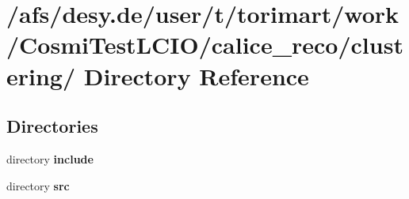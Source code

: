 \section{/afs/desy.de/user/t/torimart/work/CosmiTestLCIO/calice\_\-reco/clustering/ Directory Reference}
\label{dir_76266a67d7fd350906daaf78462c4837}
\subsection*{Directories}
\begin{DoxyCompactItemize}
\item 
directory {\bf include}
\item 
directory {\bf src}
\end{DoxyCompactItemize}
